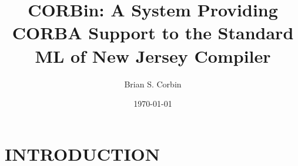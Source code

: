 \date{\today}
\author{Brian S. Corbin}
\title{CORBin:  A System Providing CORBA Support to the Standard ML of New Jersey Compiler}





\def\CPP{C\raise.22ex\hbox{{\footnotesize +}}\raise.22ex\hbox{\footnotesize +}}
\def\BCPP{C\raise.22ex\hbox{{\footnotesize \bf +}}\raise.22ex\hbox{\footnotesize \bf +}}

\def\figline{\rule{\textwidth}{0.3mm}}




\makesignature
\preliminaries
\maketitle

\begin{abstract}

\end{abstract}

\begin{dedication}

\end{dedication}
\begin{acknowledgments}

\end{acknowledgments}

\tableofcontents
\listoffigures
\body

\chapter{\uppercase{Introduction}}
\label{intro}


